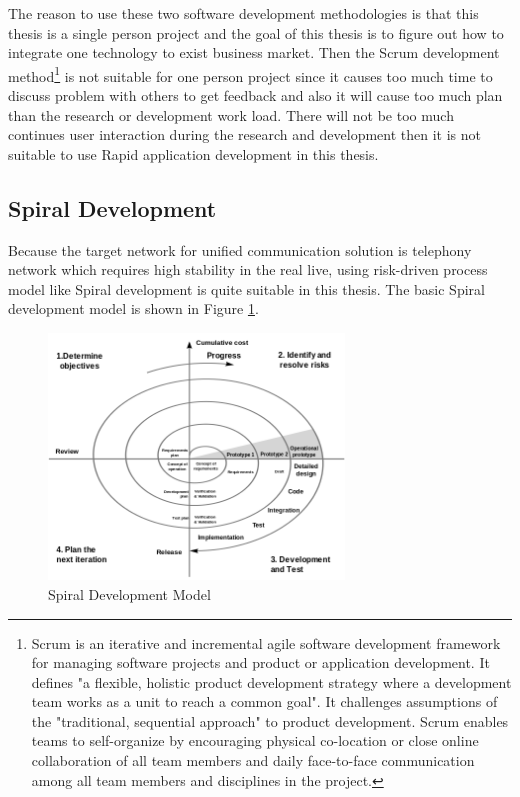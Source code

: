 \par The reason to use these two software development methodologies is that this thesis is a single person project and the goal of this thesis is to figure out how to integrate one technology to exist business market. Then the Scrum development method\footnote{Scrum is an iterative and incremental agile software development framework for managing software projects and product or application development. It defines "a flexible, holistic product development strategy where a development team works as a unit to reach a common goal". It challenges assumptions of the "traditional, sequential approach" to product development. Scrum enables teams to self-organize by encouraging physical co-location or close online collaboration of all team members and daily face-to-face communication among all team members and disciplines in the project.\cite{wiki:scrum}} is not suitable for one person project since it causes too much time to discuss problem with others to get feedback and also it will cause too much plan than the research or development work load. There will not be too much continues user interaction during the research and development then it is not suitable to use Rapid application development in this thesis.

\subsection{Spiral Development}

\par Because the target network for unified communication solution is telephony network which requires high stability in the real live, using risk-driven process model like Spiral development is quite suitable in this thesis. The basic Spiral development model is shown in Figure \ref{fig:spiral}.

\begin{figure}
	\centering
    	\includegraphics[width=0.70\textwidth,natwidth=610,natheight=642]{figs/Spiral_model.png}
  	\caption{Spiral Development Model}
  	\label{fig:spiral}
\end{figure}

